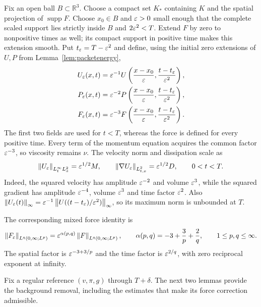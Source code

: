 \documentclass[11pt,a4paper]{article}
\theoremstyle{definition}\newtheorem{definition}[theorem]{Definition}
\theoremstyle{remark}\newtheorem{remark}[theorem]{Remark}
\newcommand{\R}{\mathbb R}\newcommand{\TT}{\mathbb T^3}
\newcommand{\norm}[1]{\left\lVert#1\right\rVert}
\begin{document}
Fix an open ball $B\subset\R^3$. Choose a compact set $K_*$ containing $K$ and the spatial projection of $\operatorname{supp}F$. Choose $x_0\in B$ and $\varepsilon>0$ small enough that the complete scaled support lies strictly inside $B$ and $2\varepsilon^2<T$. Extend $F$ by zero to nonpositive times as well; its compact support in positive time makes this extension smooth. Put $t_\varepsilon=T-\varepsilon^2$ and define, using the initial zero extensions of $U,P$ from Lemma~\ref{lem:packetenergy},
\begin{align}
 U_\varepsilon(x,t)&=\varepsilon^{-1}U\left(\frac{x-x_0}{\varepsilon},\frac{t-t_\varepsilon}{\varepsilon^2}\right),\nonumber\\
 P_\varepsilon(x,t)&=\varepsilon^{-2}P\left(\frac{x-x_0}{\varepsilon},\frac{t-t_\varepsilon}{\varepsilon^2}\right),\label{eq:scaling}\\
 F_\varepsilon(x,t)&=\varepsilon^{-3}F\left(\frac{x-x_0}{\varepsilon},\frac{t-t_\varepsilon}{\varepsilon^2}\right).\nonumber
\end{align}
The first two fields are used for $t<T$, whereas the force is defined for every positive time. Every term of the momentum equation acquires the common factor $\varepsilon^{-3}$, so viscosity remains $\nu$. The velocity norm and dissipation scale as
\begin{equation}\label{eq:packetEscale}
 \norm{U_\eps}_{L^\infty_tL^2_x}=\eps^{1/2}M,\qquad
 \norm{\nabla U_\eps}_{L^2_{t,x}}=\eps^{1/2}D,
 \qquad 0<t<T.
\end{equation}
Indeed, the squared velocity has amplitude $\varepsilon^{-2}$ and volume $\varepsilon^3$, while the squared gradient has amplitude $\varepsilon^{-4}$, volume $\varepsilon^3$ and time factor $\varepsilon^2$. Also $\norm{U_\eps(t)}_\infty=\eps^{-1}\norm{U((t-t_\eps)/\eps^2)}_\infty$, so its maximum norm is unbounded at $T$.

The corresponding mixed force identity is
\[
 \norm{F_\eps}_{L^q(0,\infty;L^p)}
 =\eps^{\alpha(p,q)}\norm{F}_{L^q(0,\infty;L^p)},
 \qquad \alpha(p,q)=-3+\frac3p+\frac2q,
 \qquad 1\le p,q\le\infty.
\]
The spatial factor is $\varepsilon^{-3+3/p}$ and the time factor is $\varepsilon^{2/q}$, with zero reciprocal exponent at infinity.

Fix a regular reference $(v,\pi,g)$ through $T+\delta$. The next two lemmas provide the background removal, including the estimates that make its force correction admissible.
\end{document}
